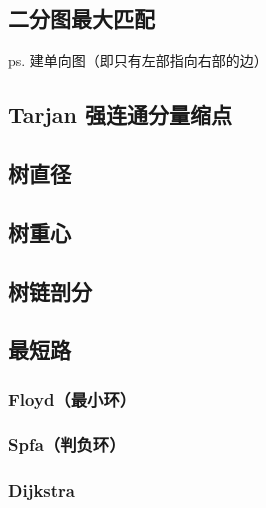 \documentclass{article}
\begin{document}


\subsection{二分图最大匹配}

ps. 建单向图（即只有左部指向右部的边）



\subsection{Tarjan 强连通分量缩点}



\subsection{树直径}



\subsection{树重心}



\subsection{树链剖分}

\subsection{最短路}

\subsubsection{Floyd（最小环）}



\subsubsection{Spfa（判负环）}

\subsubsection{Dijkstra}
\end{document}
